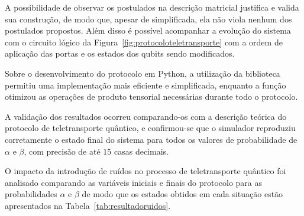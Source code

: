 A possibilidade de observar os postulados na descrição matricial justifica e valida sua construção, de modo que, apesar de simplificada, ela não viola nenhum dos postulados propostos. Além disso é possível acompanhar a evolução do sistema com o circuito lógico da Figura~\ref{fig:protocoloteletransporte} com a ordem de aplicação das portas e os estados dos qubits sendo modificados.

Sobre o desenvolvimento do protocolo em Python, a utilização da biblioteca  permitiu uma implementação mais eficiente e simplificada, enquanto a função  otimizou as operações de produto tensorial necessárias durante todo o protocolo.

A validação dos resultados ocorreu comparando-os com a descrição teórica do protocolo de teletransporte quântico, e confirmou-se que o simulador reproduziu corretamente o estado final do sistema para todos os valores de probabilidade de $\alpha$ e $\beta$, com precisão de até 15 casas decimais.


O impacto da introdução de ruídos no processo de teletransporte quântico foi analisado comparando as variáveis iniciais e finais do protocolo para as probabilidades $\alpha$ e $\beta$ de modo que os estados obtidos em cada situação estão apresentados na Tabela~\ref{tab:resultadoruidos}.

